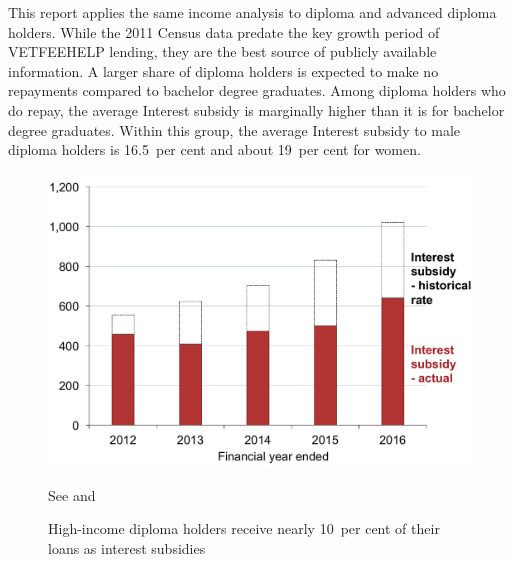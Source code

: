 \documentclass{grattan}
\begin{document}
This report applies the same income analysis to diploma and advanced diploma holders.
While the 2011 Census data predate the key growth period of \gls{VETFEEHELP} lending, they are the best source of publicly available information.
A larger share of diploma holders is expected to make no repayments compared to bachelor degree graduates.
Among diploma holders who do repay, the average \gls{Interest subsidy} is marginally higher than it is for bachelor degree graduates.
Within this group, the average \gls{Interest subsidy} to male diploma holders is 16.5~per cent and about 19~per cent for women.

\begin{figure}
\caption{High-income diploma holders receive nearly 10~per cent of their loans as interest subsidies}\label{fig:fig11-high-income-dip-holders-receive-nearly-10pc-loans-as-interest-subsides}

\includegraphics[page=11]{atlas/Chartpack.pdf}

{See  and \textcite{Ryan2016RedesigningVETFEE}}
\end{figure}
\end{document}

